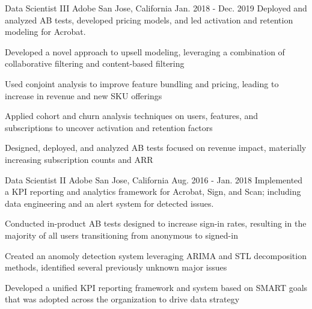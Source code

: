 \begin{cventries}
\cventry
    {Data Scientist III} %
    {Adobe} %
    {San Jose, California} %
    {Jan. 2018 - Dec. 2019} %
    {Deployed and analyzed AB tests, developed pricing models, and led activation and retention modeling for Acrobat.} %
    {
      \begin{cvitems} %
        \item {Developed a novel approach to upsell modeling, leveraging a combination of collaborative filtering and content-based filtering}
        \item {Used conjoint analysis to improve feature bundling and pricing, leading to increase in revenue and new SKU offerings}
        \item {Applied cohort and churn analysis techniques on users, features, and subscriptions to uncover activation and retention factors}
        \item {Designed, deployed, and analyzed AB tests focused on revenue impact, materially increasing subscription counts and ARR}
      \end{cvitems}
    }

\cventry
    {Data Scientist II} %
    {Adobe} %
    {San Jose, California} %
    {Aug. 2016 - Jan. 2018} %
    {Implemented a KPI reporting and analytics framework for Acrobat, Sign, and Scan; including data engineering and an alert system for detected issues.} %
    {
      \begin{cvitems} %
        \item {Conducted in-product AB tests designed to increase sign-in rates, resulting in the majority of all users transitioning from anonymous to signed-in}
        \item {Created an anomoly detection system leveraging ARIMA and STL decomposition methods, identified several previously unknown major issues}
        \item {Developed a unified KPI reporting framework and system based on SMART goals that was adopted across the organization to drive data strategy}
      \end{cvitems}
    }

\end{cventries}
